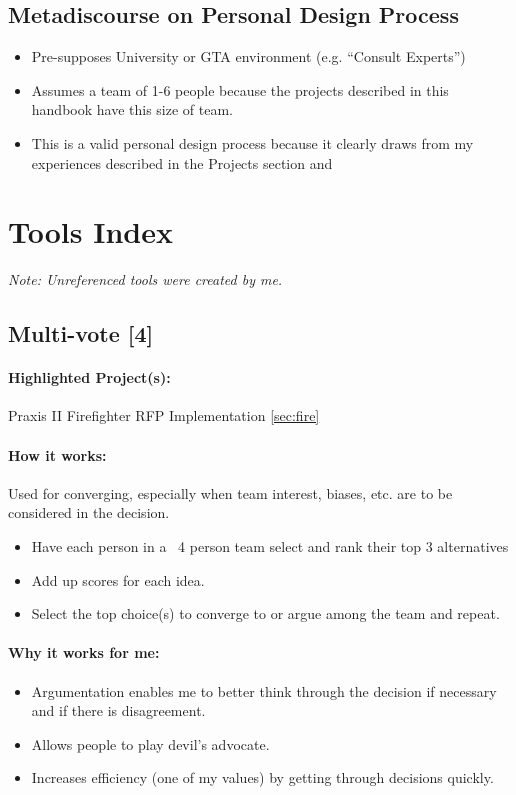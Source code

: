 \documentclass[a4paper,12pt]{article}
\begin{document}
\subsection{Metadiscourse on Personal Design Process}
\begin{itemize}
	\item Pre-supposes University or GTA environment (e.g. “Consult Experts”)
	\item Assumes a team of 1-6 people because the projects described in this handbook have this size of team.
	\item This is a valid personal design process because it clearly draws from my experiences described in the Projects section and 
\end{itemize}





\section{Tools Index \label{Tools}}
\textit{Note: Unreferenced tools were created by me.}
\subsection{Multi-vote [4]}
\label{sec:multi}
\paragraph{Highlighted Project(s): } Praxis II Firefighter RFP Implementation \ref{sec:fire}
\paragraph{How it works: } 
Used for converging, especially when team interest, biases, etc. are to be considered in the decision.
\begin{itemize}
	\item Have each person in a ~4 person team select and rank their top 3 alternatives
	\item Add up scores for each idea.
	\item Select the top choice(s) to converge to or argue among the team and repeat.
\end{itemize}

\paragraph{Why it works for me: }
\begin{itemize}
	\item Argumentation enables me to better think through the decision if necessary and if there is disagreement.
	\item Allows people to play devil’s advocate.
	\item Increases efficiency (one of my values) by getting through decisions quickly.
\end{itemize}
\end{document}
